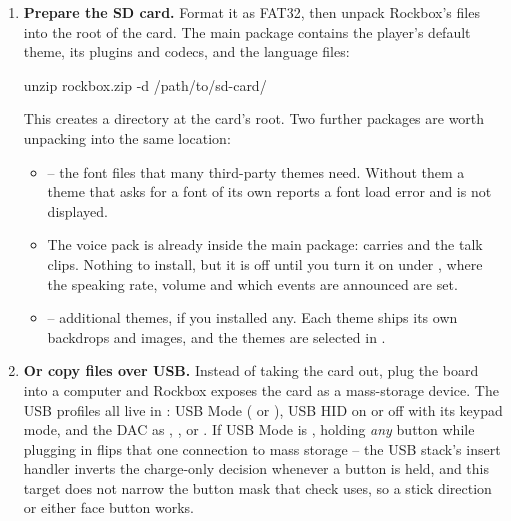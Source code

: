 \begin{enumerate}
  With no board attached,  runs  on the
  packed image and prints the segment table, load addresses and checksum the loader will
  see.

\item \textbf{Prepare the SD card.} Format it as FAT32, then unpack Rockbox's
  files into the root of the card. The main package contains the player's
  default theme, its plugins and codecs, and the language files:

\begin{code}
    unzip rockbox.zip -d /path/to/sd-card/
\end{code}

  This creates a  directory at the card's root. Two further
  packages are worth unpacking into the same location:

\begin{itemize}
  \item {} -- the font files that many third-party
    themes need. Without them a theme that asks for a font of its own reports
    a font load error and is not displayed.
  \item The voice pack is already inside the main package: 
    carries  and the talk clips. Nothing to install, but it is
    off until you turn it on under , where the speaking
    rate, volume and which events are announced are set.
  \item {} -- additional themes, if you installed any.
    Each theme ships its own backdrops and images, and the themes are selected
    in .
\end{itemize}


\item \textbf{Or copy files over USB.} Instead of taking the card out, plug the
  board into a computer and Rockbox exposes the card as a mass-storage device. The USB
  profiles all live in : USB Mode
  ( or ), USB HID on or off with its keypad
  mode, and the DAC as , , 
  or . If USB Mode is , holding
  \emph{any} button while plugging in flips that one connection to mass storage -- the
  USB stack's insert handler inverts the charge-only decision whenever a button is
  held, and this target does not narrow the button mask that check uses, so a stick
  direction or either face button works.


\end{enumerate}
